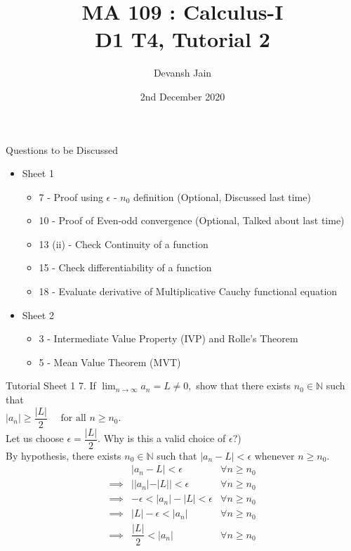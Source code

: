 \documentclass[aspectratio=169]{beamer}
\title{MA 109 : Calculus-I\\ D1 T4, Tutorial 2}
\author{Devansh Jain}
\date[02-12-2020]{2nd December 2020}
\institute[IITB]{IIT Bombay}
\begin{document}
\begin{frame}
    \titlepage
\end{frame}

\begin{frame}{Questions to be Discussed}
    \begin{itemize}
        \item Sheet 1
            \begin{itemize}
                \item 7 - Proof using $\epsilon$ - $n_0$ definition (Optional, Discussed last time)
                \item 10 - Proof of Even-odd convergence (Optional, Talked about last time)
                \item 13 (ii) - Check Continuity of a function
                \item 15 - Check differentiability of a function
                \item 18 - Evaluate derivative of Multiplicative Cauchy functional equation
            \end{itemize}
        \item Sheet 2
            \begin{itemize}
                \item 3 - Intermediate Value Property (IVP) and Rolle's Theorem
                \item 5 - Mean Value Theorem (MVT)
            \end{itemize}
    \end{itemize}
\end{frame}

\begin{frame}{Tutorial Sheet 1}
    7. If $\displaystyle\lim_{n\to \infty}a_n = L \neq 0,$ show that there exists $n_0 \in \mathbb{N}$ such that \\
    \hspace{10em} $|a_n| \ge \dfrac{|L|}{2} \quad \text{ for all } n \ge n_0.$ \\
    Let us choose $\epsilon = \dfrac{|L|}{2}.$ Why is this a valid choice of $\epsilon?$) \\
    By hypothesis, there exists $n_0 \in \mathbb{N}$ such that $|a_n - L| < \epsilon$ whenever $n \ge n_0.$
    \begin{align*}
        &|a_n - L| < \epsilon & \forall n \ge n_0 \\
        \implies& ||a_n| - |L|| < \epsilon & \forall n \ge n_0 \\
        \implies& -\epsilon < |a_n| - |L| < \epsilon & \forall n \ge n_0 \\
        \implies& |L| - \epsilon < |a_n|  & \forall n \ge n_0 \\
        \implies& \dfrac{|L|}{2} < |a_n|  & \forall n \ge n_0
    \end{align*}
\end{frame}
\end{document}
